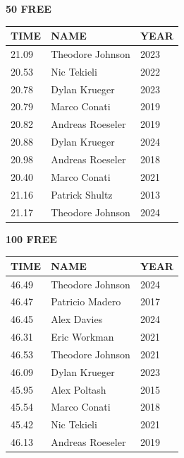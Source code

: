 \begin{table}[H]
\centering
\begin{minipage}[t]{0.48\textwidth}
\centering
\textbf{50 FREE}\\[0.1cm]
\begin{tabular}{@{}p{1.8cm}p{2.8cm}p{1.2cm}@{}}
\hline
    \textbf{TIME} & \textbf{NAME} & \textbf{YEAR} \\
\hline
    21.09 & Theodore Johnson & 2023 \\
    20.53 & Nic Tekieli & 2022 \\
    20.78 & Dylan Krueger & 2023 \\
    20.79 & Marco Conati & 2019 \\
    20.82 & Andreas Roeseler & 2019 \\
    20.88 & Dylan Krueger & 2024 \\
    20.98 & Andreas Roeseler & 2018 \\
    20.40 & Marco Conati & 2021 \\
    21.16 & Patrick Shultz & 2013 \\
    21.17 & Theodore Johnson & 2024 \\
\hline
\end{tabular}
\end{minipage}\hfill
\begin{minipage}[t]{0.48\textwidth}
\centering
\textbf{100 FREE}\\[0.1cm]
\begin{tabular}{@{}p{1.8cm}p{2.8cm}p{1.2cm}@{}}
\hline
    \textbf{TIME} & \textbf{NAME} & \textbf{YEAR} \\
\hline
    46.49 & Theodore Johnson & 2024 \\
    46.47 & Patricio Madero & 2017 \\
    46.45 & Alex Davies & 2024 \\
    46.31 & Eric Workman & 2021 \\
    46.53 & Theodore Johnson & 2021 \\
    46.09 & Dylan Krueger & 2023 \\
    45.95 & Alex Poltash & 2015 \\
    45.54 & Marco Conati & 2018 \\
    45.42 & Nic Tekieli & 2021 \\
    46.13 & Andreas Roeseler & 2019 \\
\hline
\end{tabular}
\end{minipage}
\end{table}


